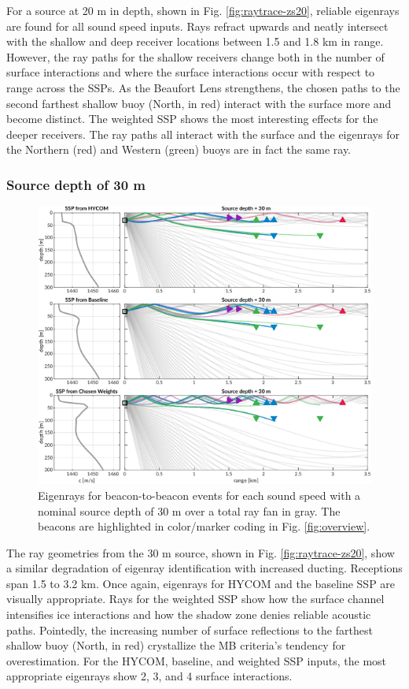 For a source at 20 m in depth, shown in Fig. \ref{fig:raytrace-zs20}, reliable eigenrays are found for all sound speed inputs.
Rays refract upwards and neatly intersect with the shallow and deep receiver locations between 1.5 and 1.8 km in range.
However, the ray paths for the shallow receivers change both in the number of surface interactions and where the surface interactions occur with respect to range across the SSPs.
As the Beaufort Lens strengthens, the chosen paths to the second farthest shallow buoy (North, in red) interact with the surface more and become distinct.
The weighted SSP shows the most interesting effects for the deeper receivers.
The ray paths all interact with the surface and the eigenrays for the Northern (red) and Western (green) buoys are in fact the same ray.

\subsubsection{Source depth of 30 m}
\begin{figure}[ht!]
  \centering
  \includegraphics[width=\columnwidth]{figs/raytrace-3env-zs-30.pdf}
  \caption{Eigenrays for beacon-to-beacon events for each sound speed with a nominal source depth of 30 m over a total ray fan in gray. The beacons are highlighted in color/marker coding in Fig. \ref{fig:overview}.}
  \label{fig:raytrace-zs30}
\end{figure}

The ray geometries from the 30 m source, shown in Fig. \ref{fig:raytrace-zs20}, show a similar degradation of eigenray identification with increased ducting.
Receptions span 1.5 to 3.2 km.
Once again, eigenrays for HYCOM and the baseline SSP are visually appropriate.
Rays for the weighted SSP show how the surface channel intensifies ice interactions and how the shadow zone denies reliable acoustic paths.
Pointedly, the increasing number of surface reflections to the farthest shallow buoy (North, in red) crystallize the MB criteria's tendency for overestimation.
For the HYCOM, baseline, and weighted SSP inputs, the most appropriate eigenrays show 2, 3, and 4 surface interactions.

